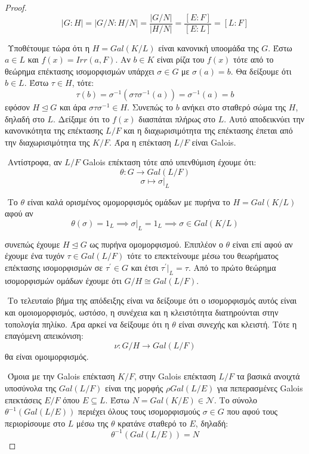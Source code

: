\documentclass[oneside,a4paper]{article}
\newcommand {\tl}{\textlatin}
\begin{document}
\begin{proof}
$$|G:H| = |G/N : H/N | = \frac{|G/N|}{|H/N|} = \frac{[E:F]}{[E:L]} = [L:F]$$

$ $\newline
Υποθέτουμε τώρα ότι η $H = Gal(K/L)$ είναι κανονική υποομάδα της $G$. Έστω $a \in L$ και $f(x) = Irr(a,F)$. Αν $b \in K$ είναι ρίζα του $f(x)$ τότε από το θεώρημα επέκτασης ισομορφισμών υπάρχει $\sigma \in G$ με $\sigma (a) = b$. Θα δείξουμε ότι $b \in L$. Έστω $\tau \in H$, τότε:
$$\tau (b) = \sigma^{-1} (\sigma \tau \sigma^{-1} (a)) = \sigma ^{-1} (a) = b$$
εφόσον $H \unlhd G$ και άρα $\sigma \tau \sigma^{-1} \in H$. Συνεπώς το $b$ ανήκει στο σταθερό σώμα της $H$, δηλαδή στο $L$. 
Δείξαμε ότι το $f(x)$ διασπάται πλήρως στο $L$. Αυτό αποδεικνύει την κανονικότητα της επέκτασης $L/F$ και η διαχωρισιμότητα της επέκτασης έπεται από την διαχωρισιμότητα της $K/F$. Άρα η επέκταση $L/F$ είναι \tl{Galois}.

$ $\newline
Αντίστροφα, αν $L/F$ \tl{Galois} επέκταση τότε από υπενθύμιση έχουμε ότι:
$$\theta: G \longrightarrow Gal(L/F)$$
$$\sigma \longmapsto \sigma|_L$$

$ $\newline
Το $\theta$ είναι καλά ορισμένος ομομορφισμός ομάδων με πυρήνα το $H = Gal(K/L)$ αφού αν
$$\theta ( \sigma ) = 1_L \implies \sigma |_L = 1_L \implies \sigma \in Gal(K/L)$$

συνεπώς έχουμε $H \unlhd G$ ως πυρήνα ομομορφισμού. Επιπλέον ο $\theta$ είναι επί αφού αν έχουμε ένα τυχόν $\tau \in Gal(L/F)$ τότε το επεκτείνουμε μέσω του θεωρήματος επέκτασης ισομορφισμών σε $\tau^{\prime} \in G$ και έτσι $\tau^{\prime}|_L = \tau$. Από το πρώτο θεώρημα ισομορφισμών ομάδων έχουμε ότι $G/H \cong Gal(L/F)$.

$ $\newline %
Το τελευταίο βήμα της απόδειξης είναι να δείξουμε ότι ο ισομορφισμός αυτός είναι και ομοιομορφισμός, ωστόσο, η συνέχεια και η κλειστότητα διατηρούνται στην τοπολογία πηλίκο. Άρα αρκεί να δείξουμε ότι η $\theta$ είναι συνεχής και κλειστή. Τότε η επαγόμενη απεικόνιση:
$$ \nu  :G/H \longrightarrow Gal(L/F)$$
θα είναι ομοιμορφισμός.

$ $\newline
Όμοια με την \tl{Galois} επέκταση $K/F$, στην \tl{Galois} επέκταση $L/F$ τα βασικά ανοιχτά υποσύνολα της $Gal(L/F)$ είναι της μορφής $\rho Gal(L/E)$ για πεπερασμένες \tl{Galois} επεκτάσεις $E/F$ όπου $E\subseteq L$. Έστω $N =Gal(K/E) \in \mathcal N$. Το σύνολο $\theta^{-1} (Gal(L/E))$ περιέχει όλους τους ισομορφισμούς $\sigma \in G$ που αφού τους περιορίσουμε στο $L$ μέσω της $\theta$ κρατάνε σταθερό το $E$, δηλαδή:
$$\theta^{-1} (Gal(L/E)) = N$$


\end{proof}
\end{document}
